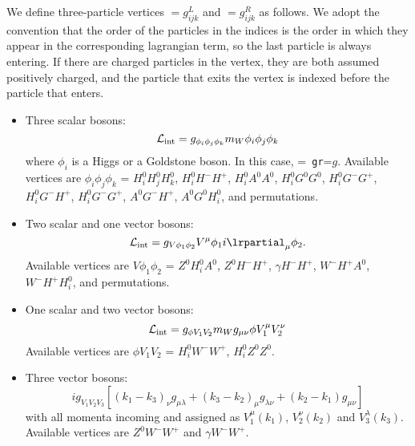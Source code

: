 We define three-particle vertices $=g^L_{ijk}$ and
$=g^R_{ijk}$ as follows. We adopt the convention
that the order of the particles in the indices is the order in which
they appear in the corresponding lagrangian term, so the last particle
is always entering. If there are charged particles in the vertex, they
are both assumed positively charged, and the particle that exits the
vertex is indexed before the particle that enters.
\begin{itemize}
\item Three scalar bosons:
\begin{equation}
{\cal L}_{\rm int} = g_{\phi_i\phi_j\phi_k} m_W \phi_i \phi_j \phi_k
\end{equation}
where $\phi_i$ is a Higgs or a Goldstone boson. In this case, ={\tt
  gr}=$g$. Available vertices are $\phi_i\phi_j\phi_k$ = $H^0_iH^0_jH^0_k$,
$H^0_iH^-H^+$, $H^0_iA^0A^0$, $H^0_iG^0G^0$, $H^0_iG^-G^+$, $H^0_iG^-H^+$,
$H^0_iG^-G^+$, $A^0G^-H^+$, $A^0G^0H^0_i$, and permutations.

\item Two scalar and one vector bosons:
\begin{equation}
{\cal L}_{\rm int} = g_{V\phi_1\phi_2} V^\mu \phi_1 i \lrpartial_\mu \phi_2 .
\end{equation}
Available vertices are $V\phi_1\phi_2$ = $Z^0H^0_iA^0$, $Z^0H^-H^+$, $\gamma
H^-H^+$, $W^-H^+A^0$, $W^-H^+H^0_i$, and permutations.

\item One scalar and two vector bosons:
\begin{equation}
{\cal L}_{\rm int} = g_{\phi V_1 V_2} m_W g_{\mu\nu} \phi V^\mu_1 V^\nu_2
\end{equation}
Available vertices are $\phi V_1V_2$ = $H^0_iW^-W^+$, $H^0_iZ^0Z^0$.

\item Three vector bosons:
\begin{equation}
i g_{V_1V_2V_3} \left[ (k_1-k_3)_\nu g_{\mu\lambda} + (k_3-k_2)_\mu
  g_{\lambda\nu} + (k_2-k_1) g_{\mu\nu} \right]
\end{equation}
with all momenta incoming and assigned as $V_1^\mu(k_1)$, $V_2^\nu(k_2)$ and
$V_3^\lambda(k_3)$. 
Available vertices are $Z^0W^-W^+$ and $\gamma W^-W^+$.


\end{itemize}
